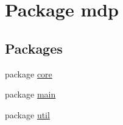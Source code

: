 \hypertarget{namespacemdp}{}\section{Package mdp}
\label{namespacemdp}
\subsection*{Packages}
\begin{DoxyCompactItemize}
\item 
package \hyperlink{namespacemdp_1_1core}{core}
\item 
package \hyperlink{namespacemdp_1_1main}{main}
\item 
package \hyperlink{namespacemdp_1_1util}{util}
\end{DoxyCompactItemize}
